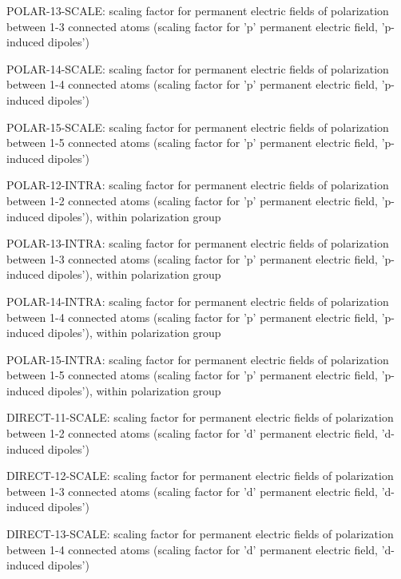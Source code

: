 \begin{DoxyItemize}
\begin{DoxyItemize}
\begin{DoxyItemize}
\item P\-O\-L\-A\-R-\/13-\/\-S\-C\-A\-L\-E\-: scaling factor for permanent electric fields of polarization between 1-\/3 connected atoms (scaling factor for 'p' permanent electric field, 'p-\/induced dipoles')
\item P\-O\-L\-A\-R-\/14-\/\-S\-C\-A\-L\-E\-: scaling factor for permanent electric fields of polarization between 1-\/4 connected atoms (scaling factor for 'p' permanent electric field, 'p-\/induced dipoles')
\item P\-O\-L\-A\-R-\/15-\/\-S\-C\-A\-L\-E\-: scaling factor for permanent electric fields of polarization between 1-\/5 connected atoms (scaling factor for 'p' permanent electric field, 'p-\/induced dipoles')
\item P\-O\-L\-A\-R-\/12-\/\-I\-N\-T\-R\-A\-: scaling factor for permanent electric fields of polarization between 1-\/2 connected atoms (scaling factor for 'p' permanent electric field, 'p-\/induced dipoles'), within polarization group
\item P\-O\-L\-A\-R-\/13-\/\-I\-N\-T\-R\-A\-: scaling factor for permanent electric fields of polarization between 1-\/3 connected atoms (scaling factor for 'p' permanent electric field, 'p-\/induced dipoles'), within polarization group
\item P\-O\-L\-A\-R-\/14-\/\-I\-N\-T\-R\-A\-: scaling factor for permanent electric fields of polarization between 1-\/4 connected atoms (scaling factor for 'p' permanent electric field, 'p-\/induced dipoles'), within polarization group
\item P\-O\-L\-A\-R-\/15-\/\-I\-N\-T\-R\-A\-: scaling factor for permanent electric fields of polarization between 1-\/5 connected atoms (scaling factor for 'p' permanent electric field, 'p-\/induced dipoles'), within polarization group
\item D\-I\-R\-E\-C\-T-\/11-\/\-S\-C\-A\-L\-E\-: scaling factor for permanent electric fields of polarization between 1-\/2 connected atoms (scaling factor for 'd' permanent electric field, 'd-\/induced dipoles')
\item D\-I\-R\-E\-C\-T-\/12-\/\-S\-C\-A\-L\-E\-: scaling factor for permanent electric fields of polarization between 1-\/3 connected atoms (scaling factor for 'd' permanent electric field, 'd-\/induced dipoles')
\item D\-I\-R\-E\-C\-T-\/13-\/\-S\-C\-A\-L\-E\-: scaling factor for permanent electric fields of polarization between 1-\/4 connected atoms (scaling factor for 'd' permanent electric field, 'd-\/induced dipoles')

\end{DoxyItemize}
\end{DoxyItemize}
\end{DoxyItemize}
